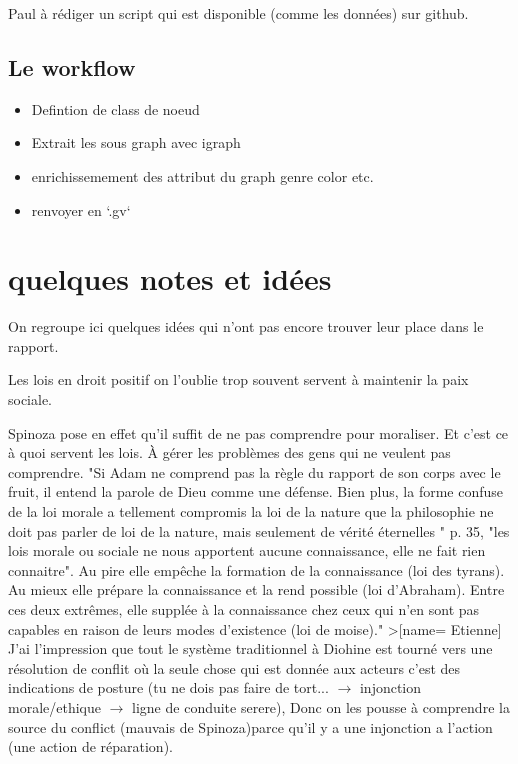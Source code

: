 Paul à rédiger un script qui est disponible (comme les données) sur github.

\subsection{ Le workflow}
\begin{itemize}
  \item Defintion de class de noeud
  \item Extrait les sous graph avec igraph
  \item enrichissemement des attribut du graph genre color etc.
  \item renvoyer en `.gv`
\end{itemize}



\section{quelques notes et idées}

On regroupe ici quelques idées qui n'ont pas encore trouver leur place dans le rapport.


Les lois en droit positif on l'oublie trop souvent servent à maintenir la paix sociale.

Spinoza pose en effet qu'il suffit de ne pas comprendre pour moraliser. Et c'est ce à quoi servent les lois. À gérer les problèmes des gens qui ne veulent pas comprendre. "Si Adam ne comprend pas la règle du rapport de son corps avec le fruit, il entend la parole de Dieu comme une défense. Bien plus, la forme confuse de la loi morale a tellement compromis la loi de la nature que la philosophie ne doit pas parler de loi de la nature, mais seulement de vérité éternelles "  p. 35, "les lois morale ou sociale ne nous apportent aucune connaissance, elle ne fait rien connaitre". Au pire elle empêche la formation de la connaissance (loi des tyrans). Au mieux elle prépare la connaissance et la rend possible (loi d'Abraham). Entre ces deux extrêmes, elle supplée à la connaissance chez ceux qui n'en sont pas capables en raison de leurs modes d'existence (loi de moise)."
>[name= Etienne] J'ai l'impression que tout le système traditionnel à Diohine est tourné vers une résolution de conflit où la seule chose qui est donnée aux acteurs c'est des indications de posture (tu ne dois pas faire de tort... $\longrightarrow$ injonction morale/ethique $\longrightarrow$ ligne de conduite serere), Donc on les pousse à comprendre la source du conflict (mauvais de Spinoza)parce qu'il y a une injonction a l'action (une action de réparation).

